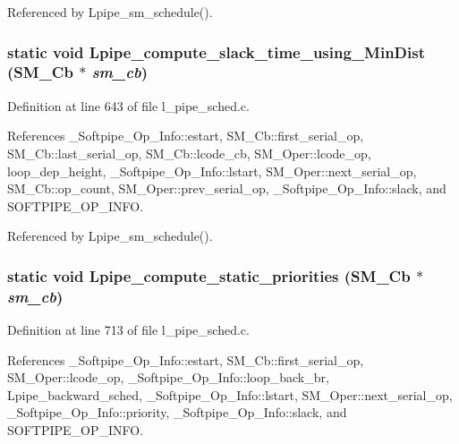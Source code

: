 Referenced by Lpipe\_\-sm\_\-schedule().
\subsubsection{\setlength{\rightskip}{0pt plus 5cm}static void Lpipe\_\-compute\_\-slack\_\-time\_\-using\_\-Min\-Dist (\bf{SM\_\-Cb} $\ast$ {\em sm\_\-cb})\hspace{0.3cm}{\tt  [static]}}\label{l__pipe__sched_8c_39d57844abbfbc77f2ddfa8f196c3ff1}




Definition at line 643 of file l\_\-pipe\_\-sched.c.

References \_\-Softpipe\_\-Op\_\-Info::estart, SM\_\-Cb::first\_\-serial\_\-op, SM\_\-Cb::last\_\-serial\_\-op, SM\_\-Cb::lcode\_\-cb, SM\_\-Oper::lcode\_\-op, loop\_\-dep\_\-height, \_\-Softpipe\_\-Op\_\-Info::lstart, SM\_\-Oper::next\_\-serial\_\-op, SM\_\-Cb::op\_\-count, SM\_\-Oper::prev\_\-serial\_\-op, \_\-Softpipe\_\-Op\_\-Info::slack, and SOFTPIPE\_\-OP\_\-INFO.

Referenced by Lpipe\_\-sm\_\-schedule().
\subsubsection{\setlength{\rightskip}{0pt plus 5cm}static void Lpipe\_\-compute\_\-static\_\-priorities (\bf{SM\_\-Cb} $\ast$ {\em sm\_\-cb})\hspace{0.3cm}{\tt  [static]}}\label{l__pipe__sched_8c_3cfd0f1b7275f44a71eed2c6048ad046}




Definition at line 713 of file l\_\-pipe\_\-sched.c.

References \_\-Softpipe\_\-Op\_\-Info::estart, SM\_\-Cb::first\_\-serial\_\-op, SM\_\-Oper::lcode\_\-op, \_\-Softpipe\_\-Op\_\-Info::loop\_\-back\_\-br, Lpipe\_\-backward\_\-sched, \_\-Softpipe\_\-Op\_\-Info::lstart, SM\_\-Oper::next\_\-serial\_\-op, \_\-Softpipe\_\-Op\_\-Info::priority, \_\-Softpipe\_\-Op\_\-Info::slack, and SOFTPIPE\_\-OP\_\-INFO.

